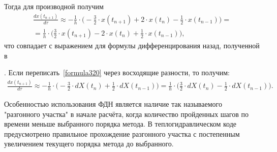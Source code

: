Тогда для производной получим
\begin{eqnarray}
\label{formula320}
\frac{dx(t_{n+1})}{d\tau}\approx -\frac 1 h \cdot \bigg(-\frac 3 2\cdot x(t_{n+1}) + 2\cdot x(t_n) -\frac 1 2 \cdot x(t_{n-1}) \bigg) = \nonumber \\
= \frac 1 h \cdot \bigg(\frac 3 2\cdot x(t_{n+1}) - 2\cdot x(t_n) +\frac 1 2 \cdot x(t_{n-1}) \bigg),
\end{eqnarray} 
что совпадает с выражением для формулы дифференцирования назад, полученной в

\noindent \cite[стр.~110]{OpenFOAM}. Если переписать~\eqref{formula320} через восходящие разности, то получим:
\begin{eqnarray}
\label{formula321}
\frac{dx(t_{n+1})}{d\tau}\approx -\frac 1 h \cdot \bigg(-\frac 3 2\cdot dX(t_n) +\frac 1 2\cdot dX(t_{n-1}) \bigg) = \frac 1 h \cdot \bigg(\frac 3 2 \cdot dX(t_n) -\frac 1 2 \cdot dX(t_{n-1}) \bigg).
\end{eqnarray}

Особенностью использования ФДН является наличие так называемого "разгонного участка" в начале расчёта, когда количество пройденных шагов по времени меньше выбранного порядка метода. В теплогидравлическом коде предусмотрено правильное прохождение разгонного участка с постепенным увеличением текущего порядка метода до выбранного.
